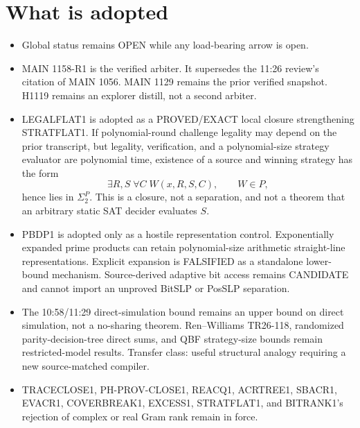 \documentclass[11pt]{article}
\begin{document}
\section*{What is adopted}
\begin{itemize}
\item Global status remains OPEN while any load-bearing arrow is open.
\item MAIN 1158-R1 is the verified arbiter. It supersedes the 11:26 review's citation
of MAIN 1056. MAIN 1129 remains the prior verified snapshot. H1119 remains an explorer
distill, not a second arbiter.
\item LEGALFLAT1 is adopted as a PROVED/EXACT local closure strengthening STRATFLAT1.
If polynomial-round challenge legality may depend on the prior transcript, but legality,
verification, and a polynomial-size strategy evaluator are polynomial time, existence of
a source and winning strategy has the form
\[
\exists R,S\;\forall C\;W(x,R,S,C),\qquad W\in P,
\]
hence lies in \(\Sigma_2^P\). This is a closure, not a separation, and not a theorem
that an arbitrary static SAT decider evaluates \(S\).
\item PBDP1 is adopted only as a hostile representation control. Exponentially expanded
prime products can retain polynomial-size arithmetic straight-line representations.
Explicit expansion is FALSIFIED as a standalone lower-bound mechanism. Source-derived
adaptive bit access remains CANDIDATE and cannot import an unproved BitSLP or PosSLP
separation.
\item The 10:58/11:29 direct-simulation bound remains an upper bound on direct simulation,
not a no-sharing theorem. Ren--Williams TR26-118, randomized parity-decision-tree direct
sums, and QBF strategy-size bounds remain restricted-model results. Transfer class:
useful structural analogy requiring a new source-matched compiler.
\item TRACECLOSE1, PH-PROV-CLOSE1, REACQ1, ACRTREE1, SBACR1, EVACR1, COVERBREAK1,
EXCESS1, STRATFLAT1, and BITRANK1's rejection of complex or real Gram rank remain in force.
\end{itemize}
\end{document}
